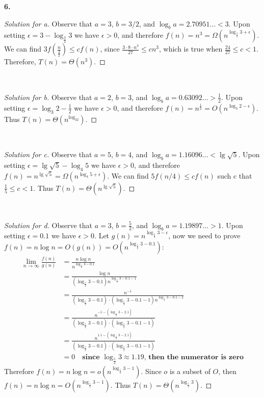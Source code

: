 \documentclass[12pt]{article}
\begin{document}
\noindent \textbf{6.}
\begin{proof}[Solution for a]
	Observe that $a=3$, $b=3/2$, and $\log_ba=2.70951\dots<3$. Upon setting $\epsilon=3-\log_{\frac{3}{2}}3$ we have $\epsilon>0$, and therefore $f(n)=n^3=\Omega(n^{\log_{\frac{3}{2}}3+\epsilon})$. We can find $3f(\frac{n}{\frac{3}{2}})\le cf(n)$, since $\frac{3\cdot8\cdot n^3}{27}\le cn^3$, which is true when $\frac{24}{27}\le c<1$. Therefore, $T(n)=\Theta(n^3)$.
\end{proof}
\ \\
\begin{proof}[Solution for b]
	Observe that $a=2$, $b=3$, and $\log_ba=0.63092\dots >\frac{1}{2}$. Upon setting $\epsilon=\log_{3}2-\frac{1}{2}$ we have $\epsilon>0$, and therefore $f(n)=n^{\frac{1}{2}}=O(n^{\log_{3}2-\epsilon})$. Thus $T(n)=\Theta(n^{\log_32})$.
\end{proof}
\ \\
\begin{proof}[Solution for c]
	Observe that $a=5$, $b=4$, and $\log_ba=1.16096\dots<\lg\sqrt{5}$. Upon setting $\epsilon=\lg\sqrt{5}-\log_{4}5$ we have $\epsilon>0$, and therefore $f(n)=n^{\lg\sqrt{5}}=\Omega(n^{\log_{4}5+\epsilon})$. We can find $5f(n/4)\le cf(n)$ such c that $\frac{1}{5}\le c <1$. Thus $T(n)=\Theta(n^{\lg\sqrt{5}})$.
\end{proof}
\ \\
\begin{proof}[Solution for d]
	Observe that $a=3$, $b=\frac{5}{2}$, and $\log_ba=1.19897\dots >1$. Upon setting $\epsilon=0.1$ we have $\epsilon>0$. Let $g(n)=n^{\log_{\frac{5}{2}}3-\epsilon}$, now we need to prove $f(n)=n\log n=O(g(n))=O(n^{\log_{\frac{5}{2}}3-0.1})$:
	\begin{align*}
		\lim\limits_{n\to\infty}\frac{f(n)}{g(n)}&=\frac{n\log n}{n^{\log_{\frac{5}{2}}3-0.1}}\\
		&=\frac{\log n}{(\log_{\frac{5}{2}}3-0.1)n^{\log_{\frac{5}{2}}3-0.1-1}}\\
		&=\frac{n^{-1}}{(\log_{\frac{5}{2}}3-0.1)\cdot(\log_{\frac{5}{2}}3-0.1-1)n^{\log_{\frac{5}{2}}3-0.1-2}}\\
		&=\frac{n^{-1-(\log_{\frac{5}{2}}3-2.1)}}{(\log_{\frac{5}{2}}3-0.1)\cdot(\log_{\frac{5}{2}}3-0.1-1)}\\
		&=\frac{n^{1.1-(\log_{\frac{5}{2}}3-2.1)}}{(\log_{\frac{5}{2}}3-0.1)\cdot(\log_{\frac{5}{2}}3-0.1-1)} \\
		&=0\quad\textbf{since $\log_{\frac{5}{2}}3\approx1.19$, then the numerator is zero}
	\end{align*}
	Therefore $f(n)=n\log n=o(n^{\log_{\frac{5}{2}}3-1})$. Since $o$ is a subset of $O$, then $f(n)=n\log n=O(n^{\log_{\frac{5}{2}}3-1})$. Thus $T(n)=\Theta(n^{\log_{\frac{5}{2}}3})$.
	
\end{proof}
\end{document}
